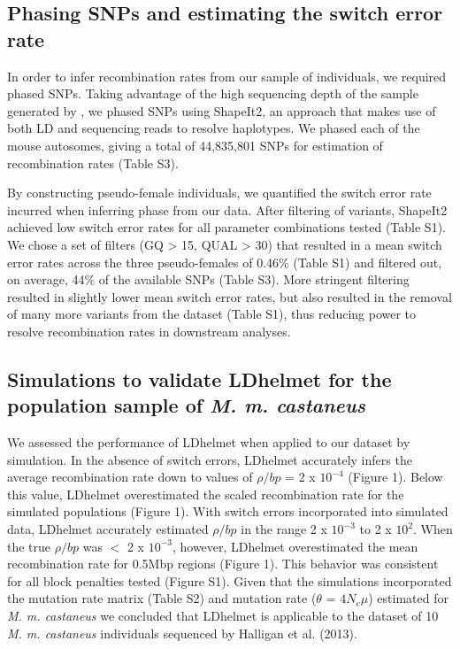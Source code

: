 \subsection{Phasing SNPs and estimating the switch error rate}
 
In order to infer recombination rates from our sample of individuals, we required phased SNPs. Taking advantage of the high sequencing depth of the sample generated by \cite{RN122}, we phased SNPs using ShapeIt2, an approach that makes use of both LD and sequencing reads to resolve haplotypes. We phased each of the mouse autosomes, giving a total of 44,835,801 SNPs for estimation of recombination rates (Table S3). 
 
By constructing pseudo-female individuals, we quantified the switch error rate incurred when inferring phase from our data. After filtering of variants, ShapeIt2 achieved low switch error rates for all parameter combinations tested (Table S1). We chose a set of filters (GQ > 15, QUAL > 30) that resulted in a mean switch error rates across the three pseudo-females of 0.46\% (Table S1) and filtered out, on average, 44\% of the available SNPs (Table S3). More stringent filtering resulted in slightly lower mean switch error rates, but also resulted in the removal of many more variants from the dataset (Table S1), thus reducing power to resolve recombination rates in downstream analyses.
 
\subsection{Simulations to validate LDhelmet for the population sample of \emph{M. m. castaneus}}
 
We assessed the performance of LDhelmet when applied to our dataset by simulation. In the absence of switch errors, LDhelmet accurately infers the average recombination rate down to values of $\rho/bp$ = 2 x $10^{-4}$ (Figure 1). Below this value, LDhelmet overestimated the scaled recombination rate for the simulated populations (Figure 1). With switch errors incorporated into simulated data, LDhelmet accurately estimated $\rho/bp$ in the range 2 x $10^{-3}$ to 2 x $10^{2}$. When the true $\rho/bp$ was $<$ 2 x $10^{-3}$, however, LDhelmet overestimated the mean recombination rate for 0.5Mbp regions (Figure 1). This behavior was consistent for all block penalties tested (Figure S1). Given that the simulations incorporated the mutation rate matrix (Table S2) and mutation rate ($\theta$ = $4N_{e}\mu$) estimated for \emph{M. m. castaneus} we concluded that LDhelmet is applicable to the dataset of 10 \emph{M. m. castaneus} individuals sequenced by Halligan et al. (2013).
 
